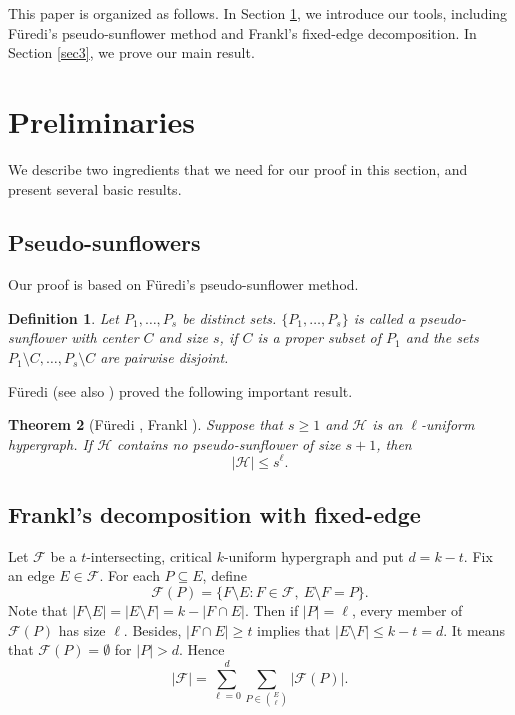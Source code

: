 \documentclass[11pt]{article}
\numberwithin{equation}{section}
\newtheorem{theorem}{Theorem}[section]
\newtheorem{definition}[theorem]{Definition}
\newcommand{\F}{\mathcal{F}}
\begin{document}
This paper is organized as follows. In Section  \ref{sec2}, we introduce our tools, including F\"{u}redi's pseudo-sunflower method and  Frankl's fixed-edge decomposition. In  Section  \ref{sec3}, we prove our main result.
	
	\section{Preliminaries}\label{sec2}

We describe two ingredients that we need  for our proof in this section, and present several basic results.
	\subsection{Pseudo-sunflowers}
	Our proof is based on F\"{u}redi's pseudo-sunflower  method.
	\begin{definition}
		Let $P_1,\ldots,P_s$ be distinct sets. $\{P_1,\ldots,P_s\}$ is called a pseudo-sunflower with center $C$ and size $s$, if $C$ is a proper subset of $P_1$ and the sets
		$
		P_1\setminus C,\ldots,P_s\setminus C
		$
		are pairwise disjoint.
		
	\end{definition}
	F\"{u}redi \cite{Furedi} (see also \cite{FranklPseudo}) proved the following important result.
	\begin{theorem}[F\"{u}redi \cite{Furedi}, Frankl \cite{FranklPseudo}]\label{thm:furedi}
		Suppose that $s\ge 1$ and  $\mathcal H$ is an $\ell$-uniform hypergraph.  If $\mathcal H$ contains no pseudo-sunflower of size $s+1$, then
		\[
		|\mathcal H|\le s^\ell.
		\]
		
		\end{theorem}
	
	 \subsection{Frankl's decomposition with fixed-edge}
	Let $\mathcal F$ be a $t$-intersecting, critical $k$-uniform hypergraph and put $d=k-t$.  Fix an edge
	$
	E\in\mathcal F.
	$
	For each $P\subseteq E$, define
	\[
	\mathcal F(P)=\{F\setminus E:F\in\mathcal F,\ E\setminus F=P\}.
	\]
	Note that $|F\setminus E|=|E\setminus F|=k-|F\cap E|$. Then if $|P|=\ell$, every member of $\F(P)$ has size $\ell$. Besides, $|F\cap E|\ge t$ implies that $|E\setminus F|\le k-t=d$. It means that $\mathcal F(P)=\emptyset$ for $|P|>d$. Hence
	\begin{equation}\label{eq:fixed-edge-sum}
		|\mathcal F|
		=
		\sum_{\ell=0}^{d}\sum_{P\in\binom{E}{\ell}} |\mathcal F(P)|.
	\end{equation}
	
\end{document}

